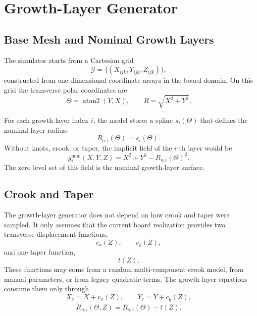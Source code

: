 \documentclass[11pt]{article}
\begin{document}
\section{Growth-Layer Generator}

\subsection{Base Mesh and Nominal Growth Layers}

The simulator starts from a Cartesian grid
\begin{equation}
\mathcal{G} = \{(X_{ijk},Y_{ijk},Z_{ijk})\},
\end{equation}
constructed from one-dimensional coordinate arrays in the board domain. On this grid the transverse polar
coordinates are
\begin{equation}
\Theta = \operatorname{atan2}(Y,X),
\qquad
R = \sqrt{X^2 + Y^2}.
\end{equation}

For each growth-layer index $i$, the model stores a spline $s_i(\Theta)$ that defines the nominal layer radius:
\begin{equation}
R_{o,i}(\Theta) = s_i(\Theta).
\end{equation}
Without knots, crook, or taper, the implicit field of the $i$-th layer would be
\begin{equation}
g_i^{\mathrm{nom}}(X,Y,Z) = X^2 + Y^2 - R_{o,i}(\Theta)^2.
\end{equation}
The zero level set of this field is the nominal growth-layer surface.

\subsection{Crook and Taper}

The growth-layer generator does not depend on how crook and taper were sampled. It only assumes that the
current board realization provides two transverse displacement functions,
\[
c_x(Z), \qquad c_y(Z),
\]
and one taper function,
\[
t(Z).
\]
These functions may come from a random multi-component crook model, from manual parameters, or from legacy
quadratic terms. The growth-layer equations consume them only through
\begin{equation}
X_c = X + c_x(Z),
\qquad
Y_c = Y + c_y(Z),
\end{equation}
\begin{equation}
\widetilde{R}_{o,i}(\Theta,Z) = R_{o,i}(\Theta) - t(Z).
\end{equation}
\end{document}
